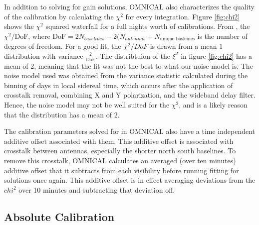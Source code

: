 \documentclass[twocolumn,numberedappendix]{emulateapj} \shorttitle{PSA64}
\begin{document}
In addition to solving for gain solutions, OMNICAL also characterizes the
quality of the calibration by calculating the $\chi^{2}$ for every integration.
Figure \ref{fig:chi2} shows the $\chi^{2}$ squared waterfall for a full nights
worth of calibrations. From \cite{zheng_et_al2014}, the $\chi^{2}/\text{DoF}$,
where $\text{DoF} = 2N_{baselines} - 2(N_{antennas} + N_{\text{unique
basleines}} $ is the number of degrees of freedom. For a good fit, the
$\chi^{2}/DoF$ is drawn from a mean 1 distribution with variance
$\frac{2}{\text{DoF}}$. The distribtuion of the $\xi^{2}$ in figure
\ref{fig:chi2} has a mean of 2, meaning that the fit was not the best to what
our noise model is.  The noise model used was obtained from the variance
statistic calculated during the binning of days in local sidereal time, which
occurs after the application of crosstalk removal, combining X and Y
polarization, and the wideband delay filter. Hence, the noise model may not be
well suited for the $\chi^{2}$, and is a likely reason that the distribution
has a mean of 2.

The calibration parameters solved for in OMNICAL also have a time independent
additive offset associated with them, This additive offset is associated with
crosstalk between antennas, especially the shorter north south baselines.
To remove this crosstalk, OMNICAL calculates an averaged (over ten minutes)
additive offset that it subtracts from each visibility before running fitting
for solutions once again. This additive offset is in effect averaging deviations
from the $chi^{2}$ over 10 minutes and subtracting that deviation off.

\subsection{Absolute Calibration} 
%
\end{document}
